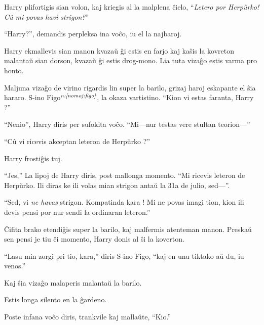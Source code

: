 Harry plifortigis sian volon, kaj kriegis al la malplena ĉielo,
``\emph{Letero por Herpŭrko! Cû mi povas havi strigon?}''

``Harry?'', demandis perpleksa ina voĉo, iu el la najbaroj.

Harry ekmallevis sian manon kvazaŭ ĝi estis en farjo kaj kaŝis la
kovreton malantaŭ sian dorson, kvazaŭ ĝi estis drog-mono. Lia tuta
vizaĝo estis varma pro honto.

Maljuna vizaĝo de virino rigardis lin super la barilo, grizaj haroj
eskapante el ŝia hararo. S-ino Figo$^{\textit{n:\ref{nomoj:figo}}}$, la okaza
vartistino. ``Kion vi estas faranta, Harry ?''

``Nenio'', Harry diris per sufokita voĉo. ``Mi—nur testas vere stultan
teorion—''

``Cû vi ricevis akceptan leteron de Herpŭrko ?''

Harry frostiĝis tuj.

``Jes,'' La lipoj de Harry diris, post mallonga momento. ``Mi ricevis
leteron de Herpŭrko. Ili diras ke ili volas mian strigon antaŭ la 31a
de julio, sed—''.

``Sed, vi \emph{ne havas} strigon. Kompatinda kara ! Mi ne povas imagi tion, kion
ili devis pensi por nur sendi la ordinaran leteron.''

Ĉifita brako etendiĝis super la barilo, kaj malfermis atenteman
manon. Preskaŭ sen pensi je tiu ĉi momento, Harry donis al ŝi la koverton.

``Lasu min zorgi pri tio, kara,'' diris S-ino Figo, ``kaj en unu tiktako aŭ du, iu venos.''  

Kaj ŝia vizaĝo malaperis malantaŭ la barilo.

Estis longa silento en la ĝardeno.

Poste infana voĉo diris, trankvile kaj mallaŭte, ``Kio.''
